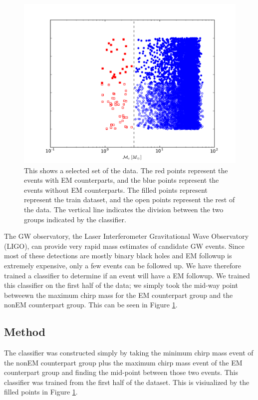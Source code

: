 \begin{figure}[ht]
  \includegraphics[width=\columnwidth]{img/output/classifier_comparison}
  \caption{This shows a selected set of the data. The red points represent the events with EM counterparts, and the blue points represent the events without EM counterparts. The filled points represent represent the train dataset, and the open points represent the rest of the data. The vertical line indicates the division between the two groups indicated by the classifier.}
  \label{fig:class}
\end{figure}

The GW observatory, the Laser Interferometer Gravitational Wave Observatory (LIGO), can provide very rapid mass estimates of candidate GW events. Since most of these detections are mostly binary black holes and EM followup is extremely expensive, only a few events can be followed up. We have therefore trained a classifier to determine if an event will have a EM followup. We trained this classifier on the first half of the data; we simply took the mid-way point betweewn the maximum chirp mass for the EM counterpart group and the nonEM counterpart group. This can be seen in Figure \ref{fig:class}.


\subsection{Method}
The classifier was constructed simply by taking the minimum chirp mass event of the nonEM counterpart group plus the maximum chirp mass event of the EM counterpart group and finding the mid-point between those two events. This classifier was trained from the first half of the dataset. This is visiualized by the filled points in Figure \ref{fig:class}.

